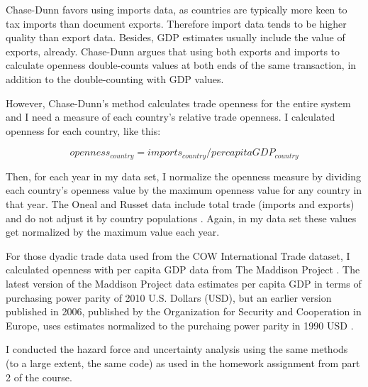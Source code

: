 \documentclass[pdftex,12pt]{article}
\begin{document}
Chase-Dunn favors using imports data, as countries are typically more keen to tax imports than document exports. 
Therefore import data tends to be higher quality than export data.
Besides, GDP estimates usually include the value of exports, already.
Chase-Dunn argues that using both exports and imports to calculate openness double-counts values at both ends of the same transaction, in addition to the double-counting with GDP values.

However, Chase-Dunn's method calculates trade openness for the entire system and I need a measure of each country's relative trade openness. 
I calculated openness for each country, like this:

\begin{equation} \label{eq:openness}
{openness_{country}}={imports_{country}}/{per capita GDP_{country}}
\end{equation}

Then, for each year in my data set, I normalize the openness measure by dividing each country's openness value by the maximum openness value for any country in that year. 
The Oneal and Russet data include total trade (imports and exports) and do not adjust it by country populations \parencite{Oneal2001}. 
Again, in my data set these values get normalized by the maximum value each year. 

For those dyadic trade data used from the COW International Trade dataset, I calculated openness with per capita GDP data from The Maddison Project \parencite{Bolt2013}. 
The latest version of the Maddison Project data estimates per capita GDP in terms of purchasing power parity of 2010 U.S. Dollars (USD), but an earlier version published in 2006, published by the Organization for Security and Cooperation in Europe, uses estimates normalized to the purchaing power parity in 1990 USD \parencite{Maddison2006}. 






I conducted the hazard force and uncertainty analysis using the same methods (to a large extent, the same code) as used in the homework assignment from part 2 of the course.

\end{document}
